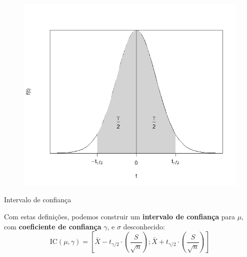\documentclass[14pt,aspectratio=1610]{beamer}
\begin{document}
\begin{frame}{}
    \begin{block}{}
    \justifying
 \begin{figure}
     \centering
     \includegraphics[scale=0.6]{figs/ICtStudent.jpeg}
 \end{figure}  
    \end{block}
\end{frame}

\begin{frame}{Intervalo de confiança}
    \begin{block}{}
    \justifying
Com estas definições, podemos construir um \textbf{intervalo de confiança} para $\mu$, com \textbf{coeficiente de confiança} $\gamma$, e
$\sigma$ desconhecido:
$$
\text{IC}(\mu, \gamma) = \left[ \bar{X} - t_{\gamma/2} \cdot
  \left(\frac{S}{\sqrt{n}}\right) ; \bar{X} + t_{\gamma/2} \cdot
  \left(\frac{S}{\sqrt{n}}\right)  \right]
$$   
   
    \end{block}
\end{frame}
\end{document}
